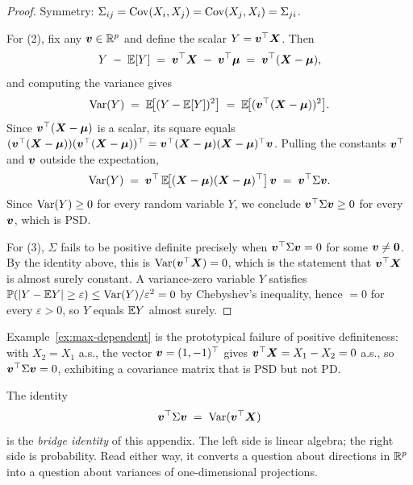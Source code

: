 \begin{proof}
Symmetry: \(\Sigma_{ij} = \operatorname{Cov}(X_i, X_j) = \operatorname{Cov}(X_j, X_i) = \Sigma_{ji}\).

For (2), fix any \(\bm{v} \in \mathbb{R}^p\) and define the scalar \(Y = \bm{v}^{\top} \bm{X}\). Then
\[
  Y \;-\; \mathbb{E}[Y] \;=\; \bm{v}^{\top} \bm{X} \;-\; \bm{v}^{\top} \bm{\mu} \;=\; \bm{v}^{\top} (\bm{X} - \bm{\mu}),
\]
and computing the variance gives
\[
  \operatorname{Var}(Y) \;=\; \mathbb{E}\!\bigl[(Y - \mathbb{E}[Y])^2\bigr] \;=\; \mathbb{E}\!\bigl[(\bm{v}^{\top} (\bm{X} - \bm{\mu}))^2\bigr].
\]
Since \(\bm{v}^{\top} (\bm{X} - \bm{\mu})\) is a scalar, its square equals \((\bm{v}^{\top} (\bm{X} - \bm{\mu}))(\bm{v}^{\top} (\bm{X} - \bm{\mu}))^{\top} = \bm{v}^{\top} (\bm{X} - \bm{\mu})(\bm{X} - \bm{\mu})^{\top} \bm{v}\). Pulling the constants \(\bm{v}^{\top}\) and \(\bm{v}\) outside the expectation,
\[
  \operatorname{Var}(Y) \;=\; \bm{v}^{\top}\, \mathbb{E}\!\bigl[(\bm{X} - \bm{\mu})(\bm{X} - \bm{\mu})^{\top}\bigr]\, \bm{v} \;=\; \bm{v}^{\top} \Sigma \bm{v}.
\]
Since \(\operatorname{Var}(Y) \ge 0\) for every random variable \(Y\), we conclude \(\bm{v}^{\top} \Sigma \bm{v} \ge 0\) for every \(\bm{v}\), which is PSD.

For (3), \(\Sigma\) fails to be positive definite precisely when \(\bm{v}^{\top} \Sigma \bm{v} = 0\) for some \(\bm{v} \ne \bm{0}\). By the identity above, this is \(\operatorname{Var}(\bm{v}^{\top} \bm{X}) = 0\), which is the statement that \(\bm{v}^{\top} \bm{X}\) is almost surely constant. A variance-zero variable \(Y\) satisfies \(\mathbb{P}(\lvert Y - \mathbb{E} Y\rvert \ge \varepsilon) \le \operatorname{Var}(Y)/\varepsilon^2 = 0\) by Chebyshev's inequality, hence \(=0\) for every \(\varepsilon > 0\), so \(Y\) equals \(\mathbb{E} Y\) almost surely.
\end{proof}

Example~\ref{ex:max-dependent} is the prototypical failure of positive definiteness: with \(X_2 = X_1\) a.s., the vector \(\bm{v} = (1, -1)^{\top}\) gives \(\bm{v}^{\top} \bm{X} = X_1 - X_2 = 0\) a.s., so \(\bm{v}^{\top} \Sigma \bm{v} = 0\), exhibiting a covariance matrix that is PSD but not PD.

The identity
\[
  \bm{v}^{\top} \Sigma \bm{v} \;=\; \operatorname{Var}(\bm{v}^{\top} \bm{X})
\]
is the \emph{bridge identity} of this appendix. The left side is linear algebra; the right side is probability. Read either way, it converts a question about directions in \(\mathbb{R}^p\) into a question about variances of one-dimensional projections.

